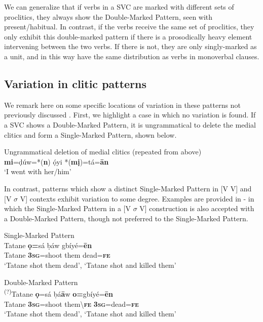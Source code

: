 \documentclass[output=paper]{langsci/langscibook}
\begin{document}
We can generalize that if verbs in a SVC are marked with different sets of proclitics, they always show the Double-Marked Pattern, seen with present/habitual. In contrast, if the verbs receive the same set of proclitics, they only exhibit this double-marked pattern if there is a prosodically heavy element intervening between the two verbs. If there is not, they are only singly-marked as a unit, and in this way have the same distribution as verbs in monoverbal clauses. 

\subsection{Variation in clitic patterns}
\label{sec:4.2}
We remark here on some specific locations of variation in these patterns not previously discussed \citep{Kari1997,Kari2003a,Kari2003b,Kari2004}. First, we highlight a case in which no variation is found. If a SVC shows a Double-Marked Pattern, it is ungrammatical to delete the medial clitics and form a Single-Marked Pattern, shown below.

\ea
{Ungrammatical deletion of medial clitics (repeated from  above)}\\
\textbf{mi}=ḍúw=*(\textbf{n})   ọ́yi   *(\textbf{mị})=tá=\textbf{ān}\\
\glt ‘I went with her/him’ \citep[201]{Kari2004}
\z

In contrast, patterns which show a distinct Single-Marked Pattern in [V V] and [V $\sigma $ V] contexts exhibit variation to some degree. Examples are provided in - in which the Single-Marked Pattern in a [V $\sigma $ V] construction is also accepted with a Double-Marked Pattern, though not preferred to the Single-Marked Pattern.

\ea\label{ex:rolle:21}
Single-Marked Pattern\\
\gll    Tatane  \textbf{ọ=}sá    ḅáw   gbíyé=\textbf{ēn}\\
     Tatane  \textbf{3}\textbf{\textsc{sg}}=shoot  them   dead=\textbf{\textsc{fe}}\\
\glt ‘Tatane shot them dead’, ‘Tatane shot and killed them’ 
\z

\ea\label{ex:rolle:22}
 Double-Marked Pattern\\
\gll  \textsuperscript{(?)}Tatane  \textbf{ọ}=sá    ḅá\textbf{ā}w    \textbf{o=}gbíyé=\textbf{ēn}\\
     Tatane  \textbf{3\textsc{sg}}=shoot   them{\textbackslash}\textbf{\textsc{fe}}    \textbf{3\textsc{sg}}=dead=\textbf{\textsc{fe}}\\
\glt ‘Tatane shot them dead’, ‘Tatane shot and killed them’
\z
\end{document}

